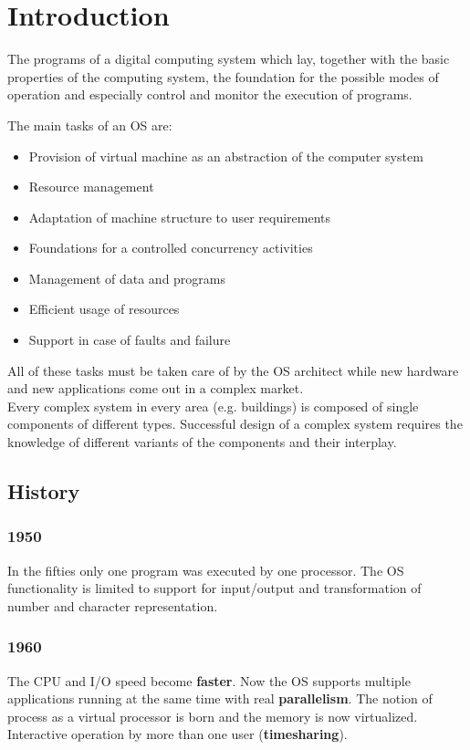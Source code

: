 \section{Introduction}
\begin{definition}
	The programs of a digital computing system which lay, together with the basic properties of the computing system, the foundation for the possible modes of operation and especially control and monitor the execution of programs.
\end{definition}

\noindent The main tasks of an OS are:
\begin{itemize}
	\item Provision of virtual machine as an abstraction of the computer system
	\item Resource management
	\item Adaptation of machine structure to user requirements
	\item Foundations for a controlled concurrency activities
	\item Management of data and programs
	\item Efficient usage of resources
	\item Support in case of faults and failure
\end{itemize}
All of these tasks must be taken care of by the OS architect while new hardware and new applications come out in a complex market.\\
Every complex system in every area (e.g. buildings) is composed of single components of different types. Successful design of a complex system requires the knowledge of different variants of the components and their interplay. 
\subsection{History}
\subsubsection{1950}
In the fifties only one program was executed by one processor. The OS functionality is limited to support for input/output and transformation of number and character representation.
\subsubsection{1960}
The CPU and I/O speed become \textbf{faster}. Now the OS supports multiple applications running at the same time with real \textbf{parallelism}. The notion of process as a virtual processor is born and the memory is now virtualized. Interactive operation by more than one user (\textbf{timesharing}).
